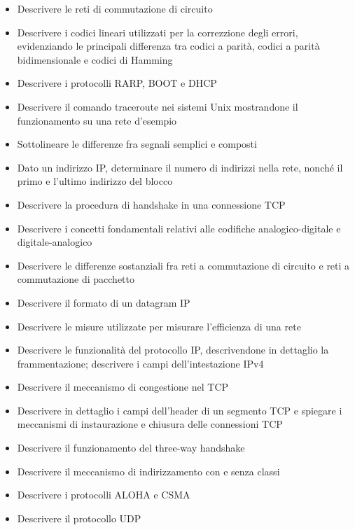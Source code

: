 \begin{itemize}
    \item
    Descrivere le reti di commutazione di circuito
    
    \item
    Descrivere i codici lineari utilizzati per la correzzione degli errori, evidenziando le principali differenza tra codici a parità, codici a parità bidimensionale e codici di Hamming
    
    \item
    Descrivere i protocolli RARP, BOOT e DHCP
    
    \item
    Descrivere il comando traceroute nei sistemi Unix mostrandone il funzionamento su una rete d'esempio
    
    \item
    Sottolineare le differenze fra segnali semplici e composti
    
    \item
    Dato un indirizzo IP, determinare il numero di indirizzi nella rete, nonché il primo e l'ultimo indirizzo del blocco
    
    \item
    Descrivere la procedura di handshake in una connessione TCP
    
    \item
    Descrivere i concetti fondamentali relativi alle codifiche analogico-digitale e digitale-analogico
    
    \item
    Descrivere le differenze sostanziali fra reti a commutazione di circuito e reti a commutazione di pacchetto
    
    \item
    Descrivere il formato di un datagram IP
    
    \item
    Descrivere le misure utilizzate per misurare l'efficienza di una rete
    
    \item
    Descrivere le funzionalità del protocollo IP, descrivendone in dettaglio la frammentazione; descrivere i campi dell'intestazione IPv4
    
    \item
    Descrivere il meccanismo di congestione nel TCP
    
    \item
    Descrivere in dettaglio i campi dell'header di un segmento TCP e spiegare i meccanismi di instaurazione e chiusura delle connessioni TCP
    
    \item
    Descrivere il funzionamento del three-way handshake
    
    \item
    Descrivere il meccanismo di indirizzamento con e senza classi
    
    \item
    Descrivere i protocolli ALOHA e CSMA
    
    \item
    Descrivere il protocollo UDP
\end{itemize}